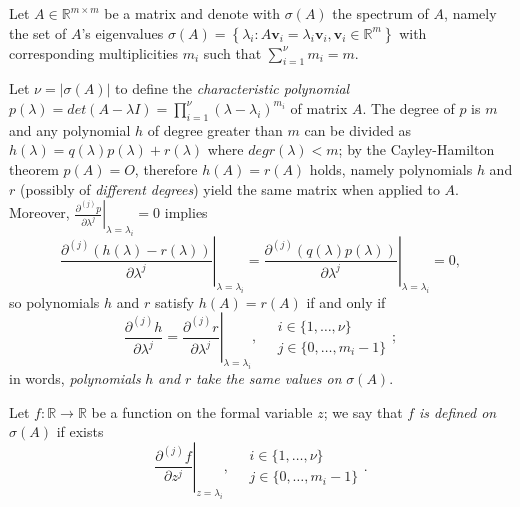 
Let $A\in\mathbb{R}^{m\times m}$ be a matrix and denote with $\sigma(A)$ the
spectrum of $A$, namely the set of $A$'s eigenvalues
$\sigma(A) = \left\lbrace \lambda_{i}:
A\boldsymbol{v}_{i}=\lambda_{i}\boldsymbol{v}_{i},
\boldsymbol{v}_{i}\in\mathbb{R}^{m}\right\rbrace$
with corresponding multiplicities $m_{i}$ such that $ \sum_{i=1}^{\nu}{m_{i}}=m$.

Let $\nu=\left|\sigma(A)\right|$ to define the \textit{characteristic
polynomial} $p(\lambda)=det{\left(A-\lambda
I\right)}=\prod_{i=1}^{\nu}{(\lambda - \lambda_{i})^{m_{i}}}$ of matrix $A$.
The degree of $p$ is $m$ and any polynomial $h$ of degree greater than $m$ can
be divided as $h(\lambda) = q(\lambda)p(\lambda)+r(\lambda)$ where
$deg{r(\lambda) < m}$; by the Cayley-Hamilton theorem $p(A)=O$, therefore
$h(A) = r(A)$ holds, namely polynomials $h$ and $r$ (possibly of
\textit{different degrees}) yield the same matrix when applied to $A$.
Moreover, $\displaystyle \left. \frac{\partial^{(j)}{p}}{\partial{\lambda}^{j}}
\right|_{\lambda=\lambda_{i}}=0 $ implies
\begin{displaymath}
\left.\frac{\partial^{(j)}\left(h(\lambda) - r(\lambda)\right)}{\partial\lambda^{j}}\right|_{\lambda=\lambda_{i}} =
\left.\frac{\partial^{(j)}\left(q(\lambda)p(\lambda)\right)}{\partial\lambda^{j}}\right|_{\lambda=\lambda_{i}} = 0,
\end{displaymath}
so polynomials $h$ and $r$ satisfy $h(A)=r(A)$ if and only if
\begin{displaymath}
\left.\frac{\partial^{(j)}h}{\partial\lambda^{j}}=\frac{\partial^{(j)}r}{\partial\lambda^{j}}\right|_{\lambda=\lambda_{i}},
\quad 
\begin{array}{l} 
    i\in \lbrace 1, \ldots, \nu \rbrace \\
    j \in \lbrace 0, \ldots, m_{i}-1 \rbrace
\end{array};
\end{displaymath}
in words, \textit{polynomials} $h$ \textit{and} $r$ \textit{take the same values on} $\sigma(A)$.

Let $f:\mathbb{R}\rightarrow \mathbb{R}$ be a function on the formal variable
$z$; we say that $f$ \textit{is defined on $\sigma(A)$} if exists
\begin{displaymath}
    \left. \frac{\partial^{(j)}{f}}{\partial{z}^{j}} \right|_{z=\lambda_{i}},
    \quad 
    \begin{array}{l} 
        i\in \lbrace 1, \ldots, \nu \rbrace \\
        j \in \lbrace 0, \ldots, m_{i}-1 \rbrace
    \end{array}.
\end{displaymath}

